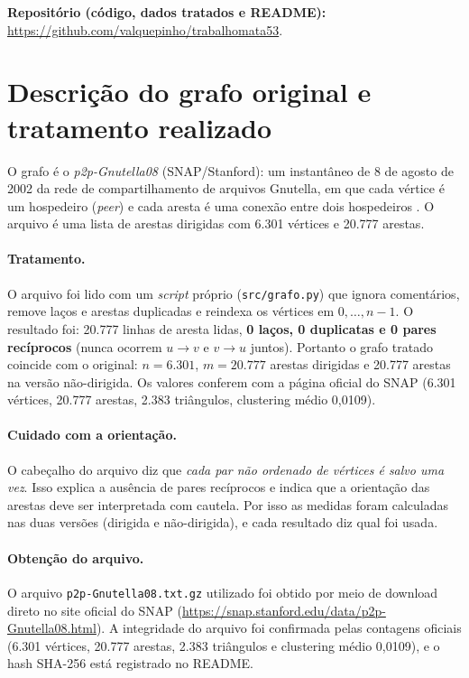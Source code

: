 \documentclass[10pt,a4paper,twocolumn]{article}
\begin{document}
\medskip\noindent\textbf{Repositório (código, dados tratados e README):} \url{https://github.com/valquepinho/trabalhomata53}.

\section{Descrição do grafo original e tratamento realizado}
O grafo é o \emph{p2p-Gnutella08} (SNAP/Stanford): um instantâneo de 8 de agosto de 2002 da rede de compartilhamento de arquivos Gnutella, em que cada vértice é um hospedeiro (\emph{peer}) e cada aresta é uma conexão entre dois hospedeiros \cite{leskovec2007,ripeanu2002}. O arquivo é uma lista de arestas dirigidas com 6.301 vértices e 20.777 arestas.

\paragraph{Tratamento.} O arquivo foi lido com um \emph{script} próprio (\texttt{src/grafo.py}) que ignora comentários, remove laços e arestas duplicadas e reindexa os vértices em $0,\dots,n-1$. O resultado foi: 20.777 linhas de aresta lidas, \textbf{0 laços, 0 duplicatas e 0 pares recíprocos} (nunca ocorrem $u\to v$ e $v\to u$ juntos). Portanto o grafo tratado coincide com o original: $n=6.301$, $m=20.777$ arestas dirigidas e 20.777 arestas na versão não-dirigida. Os valores conferem com a página oficial do SNAP (6.301 vértices, 20.777 arestas, 2.383 triângulos, clustering médio 0,0109).

\paragraph{Cuidado com a orientação.} O cabeçalho do arquivo diz que \emph{cada par não ordenado de vértices é salvo uma vez}. Isso explica a ausência de pares recíprocos e indica que a orientação das arestas deve ser interpretada com cautela. Por isso as medidas foram calculadas nas duas versões (dirigida e não-dirigida), e cada resultado diz qual foi usada.

\paragraph{Obtenção do arquivo.} O arquivo \texttt{p2p-Gnutella08.txt.gz} utilizado foi obtido por meio de download direto no site oficial do SNAP (\url{https://snap.stanford.edu/data/p2p-Gnutella08.html}). A integridade do arquivo foi confirmada pelas contagens oficiais (6.301 vértices, 20.777 arestas, 2.383 triângulos e clustering médio 0,0109), e o hash SHA-256 está registrado no README.
\end{document}
